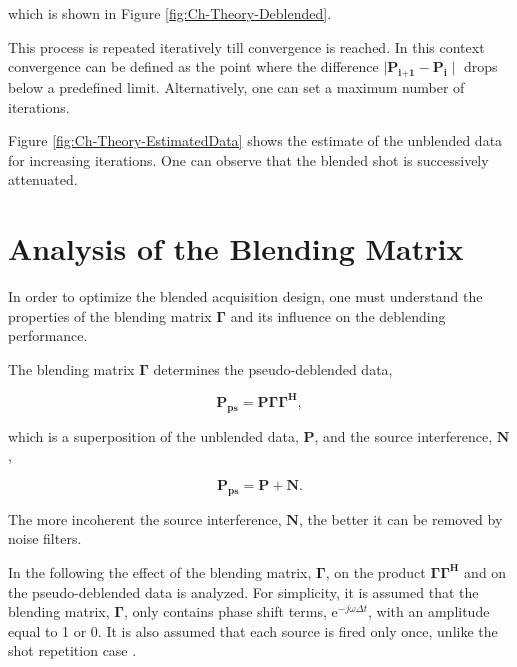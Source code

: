 which is shown in Figure \ref{fig:Ch-Theory-Deblended}.

This process is repeated iteratively till convergence is reached. In this context convergence can be defined as the point where the difference $\mid \textbf{\^P}_\textbf{i+1} - \textbf{\^{P}}_\textbf{i} \mid$ drops below a predefined limit. Alternatively, one can set a maximum number of iterations. 

Figure \ref{fig:Ch-Theory-EstimatedData} shows the estimate of the unblended data for increasing iterations. One can observe that the blended shot is successively  attenuated.



\section{Analysis of the Blending Matrix} \label{sec:BlendingMatrix}

In order to optimize the blended acquisition design, one must understand the properties of the blending matrix $\mathbf{\Gamma}$ and its influence on the deblending performance.

The blending matrix $\mathbf{\Gamma}$ determines the pseudo-deblended data,

\begin{equation}
	\mathbf{ P_{ps} } = \mathbf{P \Gamma \Gamma ^H},
	\label{eq:Ch-Theory-Pseudo-Deblended-Data}
\end{equation}

which is a superposition of the unblended data, $\mathbf{P}$, and the source interference, $\mathbf{N}$,

\begin{equation}
	\mathbf{P_{ps}} = \mathbf{P} + \mathbf{N}.
	\label{eq:Ch-Theory-PseudoSuperposition}
\end{equation}

The more incoherent the source interference, $\mathbf{N}$, the better it can be removed by noise filters.


In the following the effect of the blending matrix, $\mathbf{\Gamma}$, on the product $\mathbf{\Gamma \Gamma^H}$ and on the pseudo-deblended data is analyzed. For simplicity, it is assumed that the blending matrix, $\mathbf{\Gamma}$, only contains phase shift terms, $\mathrm{e}^{-j \omega \Delta t}$, with an amplitude equal to 1 or 0. It is also assumed that each source is fired only once, unlike the shot repetition case \citep{Sixue}.

